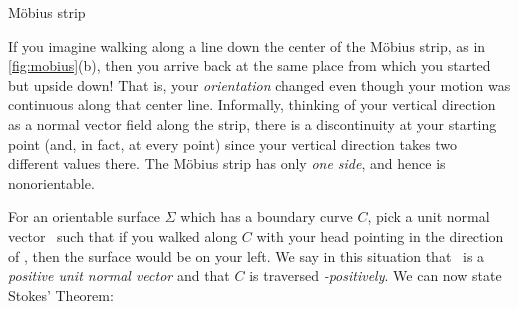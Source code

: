 \begin{lxfigure}
 \caption{M\"{o}bius strip}
 \label{fig:mobius}
\end{lxfigure}

If you imagine walking along a line down the center of the M\"{o}bius strip, as in \autoref{fig:mobius}(b), then you arrive back at the same place from which you started but upside down! That is, your \emph{orientation} changed even though your motion was continuous along that center line. Informally, thinking of your vertical direction as a normal vector field along the strip, there is a discontinuity at your starting point (and, in fact, at every point) since your vertical direction takes two different values there. The M\"{o}bius strip has only \emph{one side}, and hence is nonorientable.%

For an orientable surface $\Sigma$ which has a boundary curve $C$, pick a unit normal vector \vecn\ such that if you walked along $C$ with your head pointing in the direction of \vecn, then the surface would be on your left. We say in this situation that \vecn\ is a \emph{positive unit normal vector} and that $C$ is traversed \emph{\vecn-positively}. We can now state Stokes' Theorem:

